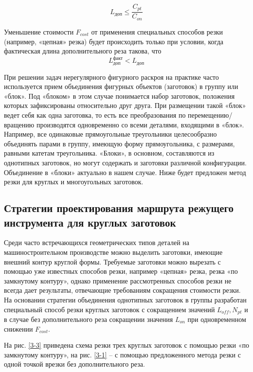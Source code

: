 \documentclass[12pt,twoside]{report}
\begin{document}
\begin{equation}
  L_\text{доп} \leqslant \frac{C_{pt}}{C_{on}}
  \label{l-dop}
\end{equation}

Уменьшение стоимости
$F_{cost}$
от применения специальных способов резки
(например, «цепная» резка)
будет происходить только при условии,
когда фактическая длина дополнительного реза
такова, что
\begin{equation}
  L_\text{доп}^\text{факт} < L_\text{доп}
  \label{l-fact-dop}
\end{equation}

При решении задач нерегулярного фигурного раскроя
на практике часто используется прием объединения
фигурных объектов (заготовок)
в группу или «блок».
Под «блоком» в этом случае понимается набор заготовок,
положения которых зафиксированы относительно друг друга.
При размещении такой «блок» ведет себя как одна заготовка,
то есть все преобразования по перемещению/вращению производятся
одновременно со всеми деталями, входящими в «блок».
Например, все одинаковые прямоугольные треугольники
целесообразно объединять парами в группу, имеющую форму прямоугольника,
с размерами, равными катетам треугольника.
«Блоки», в основном, составляются из однотипных заготовок,
но могут содержать и заготовки различной конфигурации.
Объединение в «блоки» актуально в нашем случае.
Ниже будет предложен метод резки для круглых и многоугольных заготовок.

\subsection{Стратегии проектирования маршрута режущего инструмента для круглых заготовок}

Среди часто встречающихся геометрических типов деталей
на машиностроительном производстве можно выделить заготовки,
имеющие внешний контур круглой формы.
Требуемые заготовки можно вырезать с
помощью уже известных способов резки,
например «цепная» резка, резка «по замкнутому контуру»,
однако применение рассмотренных способов резки не всегда
дает результаты, отвечающие требованиям сокращения стоимости резки.
На основании стратегии объединения однотипных заготовок
в группы разработан специальный способ резки круглых
заготовок с сокращением значений
$L_{off}, N_{pt}$
и в случае без дополнительного реза сокращении значения
$L_{on}$
при одновременном снижении
$F_{cost}$.

На рис. \ref{3-3}
приведена схема резки трех круглых заготовок
с помощью резки «по замкнутому контуру»,
на рис. \ref{3-1}
– с помощью предложенного метода резки
с одной точкой врезки без дополнительного реза.
\end{document}
